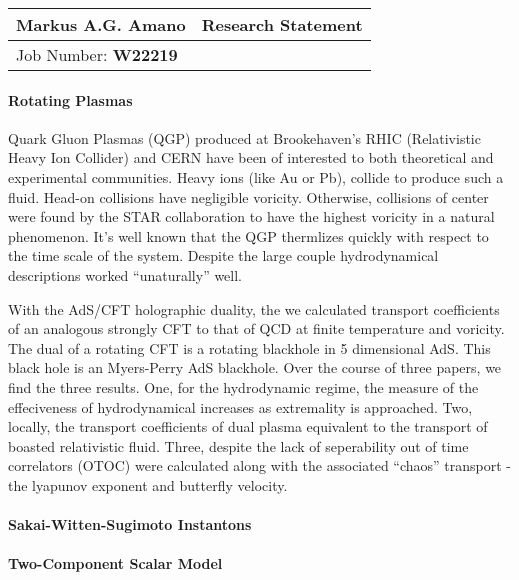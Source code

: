 \documentclass[fontsize=12pt]{article}
\begin{document}
\begin{center}
  \begin{tabularx}{\textwidth} { 
      >{\raggedright\arraybackslash}X 
    >{\raggedleft\arraybackslash}X  }
    \huge Markus A.G. Amano & Research Statement\\
    \hline
    Job Number: \textbf{W22219} & \\
  \end{tabularx}
\end{center}


\paragraph{Rotating Plasmas}

Quark Gluon Plasmas (QGP) produced at Brookehaven's RHIC (Relativistic Heavy Ion Collider) and CERN have been of interested to both theoretical and experimental communities.
Heavy ions (like Au or Pb), collide to produce such a fluid.
Head-on collisions have negligible voricity.
Otherwise, collisions of center were found by the STAR collaboration to have the highest voricity in a natural phenomenon.
It's well known that the QGP thermlizes quickly with respect to the time scale of the system.
Despite the large couple hydrodynamical descriptions worked ``unaturally'' well.

With the AdS/CFT holographic duality, the we calculated transport coefficients of an analogous strongly CFT to that of QCD at finite temperature and voricity.
The dual of a rotating CFT is a rotating blackhole in 5 dimensional AdS. This black hole is an Myers-Perry AdS blackhole.
Over the course of three papers, we find the three results. 
One, for the hydrodynamic regime, the measure of the effeciveness of hydrodynamical increases as extremality is approached.
Two, locally, the transport coefficients of dual plasma equivalent to the transport of boasted relativistic fluid.
Three, despite the lack of seperability out of time correlators (OTOC) were calculated along with the associated ``chaos'' transport - the lyapunov exponent and butterfly velocity.

\paragraph{Sakai-Witten-Sugimoto Instantons}


\paragraph{Two-Component Scalar Model}

\end{document}
